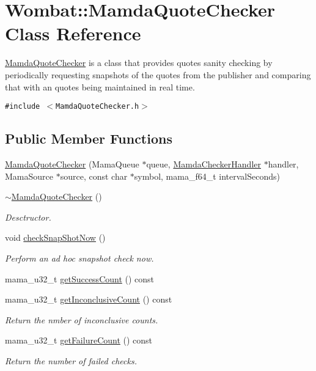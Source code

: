 \hypertarget{classWombat_1_1MamdaQuoteChecker}{
\section{Wombat::Mamda\-Quote\-Checker Class Reference}
\label{classWombat_1_1MamdaQuoteChecker}
}
\hyperlink{classWombat_1_1MamdaQuoteChecker}{Mamda\-Quote\-Checker} is a class that provides quotes sanity checking by periodically requesting snapshots of the quotes from the publisher and comparing that with an quotes being maintained in real time.  


{\tt \#include $<$Mamda\-Quote\-Checker.h$>$}

\subsection*{Public Member Functions}
\begin{CompactItemize}
\item 
\hyperlink{classWombat_1_1MamdaQuoteChecker_0ca2d9c04378c17e85e681d594b0a3c7}{Mamda\-Quote\-Checker} (Mama\-Queue $\ast$queue, \hyperlink{classWombat_1_1MamdaCheckerHandler}{Mamda\-Checker\-Handler} $\ast$handler, Mama\-Source $\ast$source, const char $\ast$symbol, mama\_\-f64\_\-t interval\-Seconds)
\item 
\hyperlink{classWombat_1_1MamdaQuoteChecker_13019a47a0962b84ae5475b9bc1dfdf1}{$\sim$Mamda\-Quote\-Checker} ()
\begin{CompactList}\small\item\em Desctructor. \item\end{CompactList}\item 
void \hyperlink{classWombat_1_1MamdaQuoteChecker_84e1ea28c2c97eac58859c06b9c65190}{check\-Snap\-Shot\-Now} ()
\begin{CompactList}\small\item\em Perform an ad hoc snapshot check now. \item\end{CompactList}\item 
mama\_\-u32\_\-t \hyperlink{classWombat_1_1MamdaQuoteChecker_1b7d7013d73ff3162c2ec7c5f764c656}{get\-Success\-Count} () const 
\item 
mama\_\-u32\_\-t \hyperlink{classWombat_1_1MamdaQuoteChecker_49868058145c3fcaea3c5cb32294bd62}{get\-Inconclusive\-Count} () const 
\begin{CompactList}\small\item\em Return the nmber of inconclusive counts. \item\end{CompactList}\item 
mama\_\-u32\_\-t \hyperlink{classWombat_1_1MamdaQuoteChecker_5a09592269398e1bbf7b0fc4ee2b6276}{get\-Failure\-Count} () const 
\begin{CompactList}\small\item\em Return the number of failed checks. \item\end{CompactList}\end{CompactItemize}


